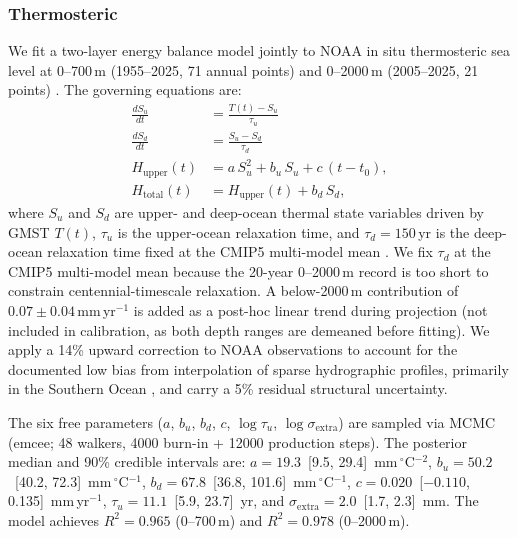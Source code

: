 \documentclass[12pt]{article}
\begin{document}
\subsubsection{Thermosteric}
We fit a two-layer energy balance model \citep{Geoffroy2013} jointly to NOAA in situ thermosteric sea level at 0--700\,m (1955--2025, 71 annual points) and 0--2000\,m (2005--2025, 21 points) \citep{Levitus2012}. The governing equations are:
\begin{align}
\frac{dS_u}{dt} &= \frac{T(t) - S_u}{\tau_u} \\
\frac{dS_d}{dt} &= \frac{S_u - S_d}{\tau_d} \\
H_{\mathrm{upper}}(t) &= a\,S_u^2 + b_u\,S_u + c\,(t - t_0), \\
H_{\mathrm{total}}(t) &= H_{\mathrm{upper}}(t) + b_d\,S_d,
\end{align}
where $S_u$ and $S_d$ are upper- and deep-ocean thermal state variables driven by GMST $T(t)$, $\tau_u$ is the upper-ocean relaxation time, and $\tau_d = 150$\,yr is the deep-ocean relaxation time fixed at the CMIP5 multi-model mean \citep{Geoffroy2013}. We fix $\tau_d$ at the CMIP5 multi-model mean because the 20-year 0--2000\,m record is too short to constrain centennial-timescale relaxation. A below-2000\,m contribution of $0.07 \pm 0.04$\,mm\,yr$^{-1}$ \citep{Purkey2010, Desbruyeres2016} is added as a post-hoc linear trend during projection (not included in calibration, as both depth ranges are demeaned before fitting). We apply a 14\% upward correction to NOAA observations to account for the documented low bias from interpolation of sparse hydrographic profiles, primarily in the Southern Ocean \citep{Li2022}, and carry a 5\% residual structural uncertainty.

The six free parameters ($a$, $b_u$, $b_d$, $c$, $\log\tau_u$, $\log\sigma_{\mathrm{extra}}$) are sampled via MCMC (emcee; 48 walkers, 4000 burn-in + 12000 production steps). The posterior median and 90\% credible intervals are: $a = 19.3$~[9.5, 29.4]~mm\,$^\circ$C$^{-2}$, $b_u = 50.2$~[40.2, 72.3]~mm\,$^\circ$C$^{-1}$, $b_d = 67.8$~[36.8, 101.6]~mm\,$^\circ$C$^{-1}$, $c = 0.020$~[$-0.110$, 0.135]~mm\,yr$^{-1}$, $\tau_u = 11.1$~[5.9, 23.7]~yr, and $\sigma_{\mathrm{extra}} = 2.0$~[1.7, 2.3]~mm. The model achieves $R^2 = 0.965$ (0--700\,m) and $R^2 = 0.978$ (0--2000\,m).
\end{document}
